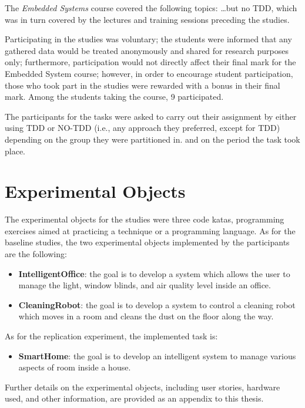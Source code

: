 The \textit{Embedded Systems} course covered the following topics: \dots but no TDD, which was in turn covered by the lectures and training sessions preceding the studies.

Participating in the studies was voluntary; the students were informed that any gathered data would be treated anonymously and shared for research purposes only; furthermore, participation would not directly affect their final mark for the Embedded System course; however, in order to encourage student participation, those who took part in the studies were rewarded with a bonus in their final mark. Among the students taking the course, 9 participated.

The participants for the tasks were asked to carry out their assignment by either using TDD or NO-TDD (i.e., any approach they preferred, except for TDD) depending on the group they were partitioned in. and on the period the task took place.



\section{Experimental Objects}
The experimental objects for the studies were three code katas, programming exercises aimed at practicing a technique or a programming language. As for the baseline studies, the two experimental objects implemented by the participants are the following:
\begin{itemize}
    \item \textbf{IntelligentOffice}: the goal is to develop a system which allows the user to manage the light, window blinds, and air quality level inside an office.
    \item \textbf{CleaningRobot}: the goal is to develop a system to control a cleaning robot which moves in a room and cleans the dust on the floor along the way. 
\end{itemize}

As for the replication experiment, the implemented task is:
\begin{itemize}
    \item \textbf{SmartHome}: the goal is to develop an intelligent system to manage various aspects of room inside a house.
\end{itemize}

Further details on the experimental objects, including user stories, hardware used, and other information, are provided as an appendix to this thesis.


